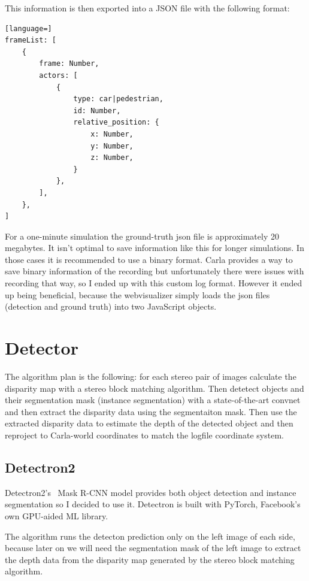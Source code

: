 This information is then exported into a JSON file with the following format:
\begin{lstlisting}[language=]
frameList: [
    {
        frame: Number,
        actors: [
            {
                type: car|pedestrian,
                id: Number,
                relative_position: {
                    x: Number,
                    y: Number,
                    z: Number,
                }
            },
        ],
    },
]
\end{lstlisting}

For a one-minute simulation the ground-truth json file is approximately 20
megabytes. It isn't optimal to save information like this for longer
simulations. In those cases it is recommended to use a binary format. Carla
provides a way to save binary information of the recording but unfortunately
there were issues with recording that way, so I ended up with this custom log
format. However it ended up being beneficial, because the webvisualizer
simply loads the json files (detection and ground truth) into two JavaScript
objects.

\section{Detector}

The algorithm plan is the following: for each stereo pair of images calculate
the disparity map with a stereo block matching algorithm. Then detetect objects
and their segmentation mask (instance segmentation) with a state-of-the-art
convnet and then extract the disparity data using the segmentaiton mask. Then
use the extracted disparity data to estimate the depth of the detected object and
then reproject to Carla-world coordinates to match the logfile coordinate
system.

\subsection{Detectron2}
Detectron2's~\cite{wu2019detectron2} Mask R-CNN model provides both object
detection and instance segmentation so I decided to use it. Detectron is built
with PyTorch, Facebook's own GPU-aided ML library.


The algorithm runs the detecton prediction only on the left image of each side,
because later on we will need the segmentation mask of the left image to extract
the depth data from the disparity map generated by the stereo block matching
algorithm. 


